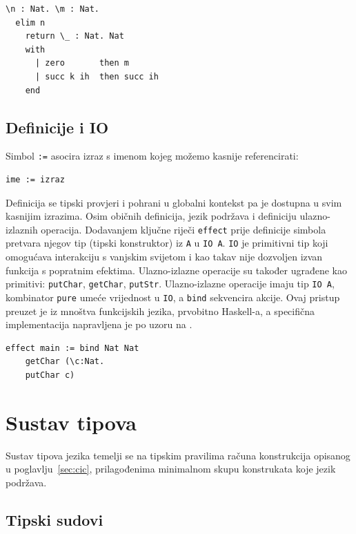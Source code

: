 \documentclass[diplomskirad,upload]{fer}
\begin{document}
\begin{verbatim}
\n : Nat. \m : Nat.
  elim n
    return \_ : Nat. Nat
    with
      | zero       then m
      | succ k ih  then succ ih
    end
\end{verbatim}

\subsection{Definicije i IO}

Simbol \texttt{:=} asocira izraz s imenom kojeg možemo kasnije referencirati:

\begin{verbatim}
ime := izraz
\end{verbatim}

Definicija se tipski provjeri i pohrani u globalni kontekst pa je dostupna u
svim kasnijim izrazima. Osim običnih definicija, jezik podržava i definiciju
ulazno-izlaznih operacija. Dodavanjem ključne riječi \texttt{effect} prije
definicije simbola pretvara njegov tip (tipski konstruktor) iz \texttt{A} u \texttt{IO A}. \texttt{IO}
je primitivni tip koji omogućava interakciju s vanjskim svijetom i kao takav
nije dozvoljen izvan funkcija s popratnim efektima. Ulazno-izlazne operacije
su također ugrađene kao primitivi: \texttt{putChar},
\texttt{getChar}, \texttt{putStr}. Ulazno-izlazne operacije
imaju tip \texttt{IO\ A}, kombinator \texttt{pure} umeće vrijednost u
\texttt{IO}, a
\texttt{bind} sekvencira akcije. Ovaj pristup preuzet je iz mnoštva funkcijskih
jezika, prvobitno Haskell-a, a specifična implementacija napravljena je po uzoru
na \cite{peytonjones2001tackling}.

\begin{verbatim}
effect main := bind Nat Nat
    getChar (\c:Nat.
    putChar c)
\end{verbatim}

\section{Sustav tipova}

Sustav tipova jezika temelji se na tipskim pravilima računa konstrukcija
opisanog u poglavlju~\ref{sec:cic}, prilagođenima minimalnom skupu konstrukata
koje jezik podržava.

\subsection{Tipski sudovi}
\end{document}
